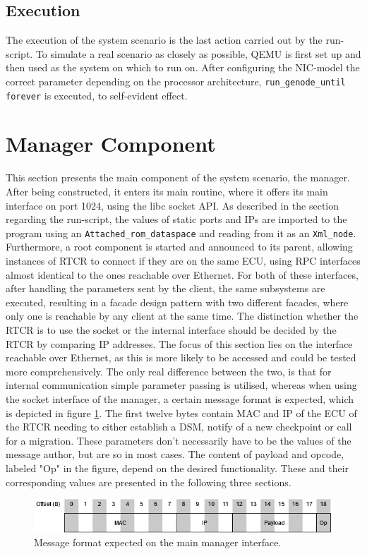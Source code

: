 \subsection{Execution}
The execution of the system scenario is the last action carried out by the run-script. To simulate a real scenario as closely as possible, QEMU is first set up and then used as the system on which to run on. After configuring the NIC-model the correct parameter depending on the processor architecture, \verb|run_genode_until forever| is executed, to self-evident effect.

\section{Manager Component}
This section presents the main component of the system scenario, the manager. After being constructed, it enters its main routine, where it offers its main interface on port 1024, using the libc socket API. As described in the section regarding the run-script, the values of static ports and IPs are imported to the program using an \verb|Attached_rom_dataspace| and reading from it as an \verb|Xml_node|. Furthermore, a root component is started and announced to its parent, allowing instances of RTCR to connect if they are on the same ECU, using RPC interfaces almost identical to the ones reachable over Ethernet. For both of these interfaces, after handling the parameters sent by the client, the same subsystems are executed, resulting in a facade design pattern with two different facades, where only one is reachable by any client at the same time. The distinction whether the RTCR is to use the socket or the internal interface should be decided by the RTCR by comparing IP addresses. The focus of this section lies on the interface reachable over Ethernet, as this is more likely to be accessed and could be tested more comprehensively. The only real difference between the two, is that for internal communication simple parameter passing is utilised, whereas when using the socket interface of the manager, a certain message format is expected, which is depicted in figure \ref{fig:main_message_format}. The first twelve bytes contain MAC and IP of the ECU of the RTCR needing to either establish a DSM, notify of a new checkpoint or call for a migration. These parameters don't necessarily have to be the values of the message author, but are so in most cases. The content of payload and opcode, labeled "Op" in the figure, depend on the desired functionality. These and their corresponding values are presented in the following three sections.
\begin{figure}
    \centering
    \includegraphics[width=\textwidth]{Images/main_message_format.png}
    \caption{Message format expected on the main manager interface.}
    \label{fig:main_message_format}
\end{figure}
